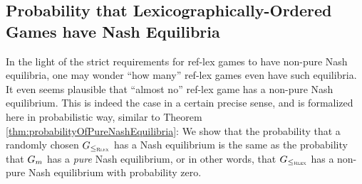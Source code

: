 \documentclass[a4paper]{scrreprt}
\theoremstyle{definition}
\begin{document}
    
    \subsection{Probability that Lexicographically-Ordered Games have Nash Equilibria}
    
    In the light of the strict requirements for ref-lex games to have non-pure Nash equilibria, one may wonder “how many” ref-lex games even have such equilibria. 
    It even seems plausible that “almost no” ref-lex game has a non-pure Nash equilibrium.
    This is indeed the case in a certain precise sense, and is formalized here in probabilistic way, similar to Theorem \ref{thm:probabilityOfPureNashEquilibria}:
    We show that the probability that a randomly chosen $G_{\leq_{\textsc{Rlex}}}$ has a Nash equilibrium is the same as the probability that $G_{m}$ has a \emph{pure} Nash equilibrium, or in other words, that $G_{\leq_{\textsc{Rlex}}}$ has a non-pure Nash equilibrium with probability zero.
    
\end{document}
